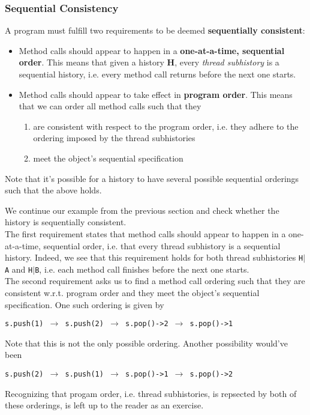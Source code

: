 \documentclass[main]{subfiles}
\begin{document}

\subsubsection{Sequential Consistency}
\begin{definition}
    A program must fulfill two requirements to be deemed \textbf{sequentially consistent}:
    \begin{itemize}
        \item Method calls should appear to happen in a \textbf{one-at-a-time, sequential order}. This means that given a history \textbf{H}, every \textit{thread subhistory} is a sequential history, i.e. every method call returns before the next one starts.
        \item Method calls should appear to take effect in \textbf{program order}. This means that we can order all method calls such that they
            \begin{enumerate}
                \item are consistent with respect to the program order, i.e. they adhere to the ordering imposed by the thread subhistories
                \item meet the object's sequential specification
            \end{enumerate} 
    \end{itemize} 
\end{definition}
Note that it's possible for a history to have several possible sequential orderings such that the above holds.
\begin{example}
    We continue our example from the previous section and check whether the history is sequentially consistent.\\[3mm]
    The first requirement states that method calls should appear to happen in a one-at-a-time, sequential order, i.e. that every thread subhistory is a sequential history. Indeed, we see that this requirement holds for both thread subhistories \texttt{H$\mid$A} and \texttt{H$\mid$B}, i.e. each method call finishes before the next one starts.\\[3mm]
    The second requirement asks us to find a method call ordering such that they are consistent w.r.t. program order and they meet the object's sequential specification. One such ordering is given by
    \begin{center}
        \texttt{s.push(1) $\rightarrow$ s.push(2) $\rightarrow$ s.pop()->2 $\rightarrow$ s.pop()->1}
    \end{center}
    Note that this is not the only possible ordering. Another possibility would've been
    \begin{center}
        \texttt{s.push(2) $\rightarrow$ s.push(1) $\rightarrow$ s.pop()->1 $\rightarrow$ s.pop()->2}
    \end{center}
    Recognizing that progam order, i.e. thread subhistories, is repsected by both of these orderings, is left up to the reader as an exercise.
\end{example}
\end{document}
